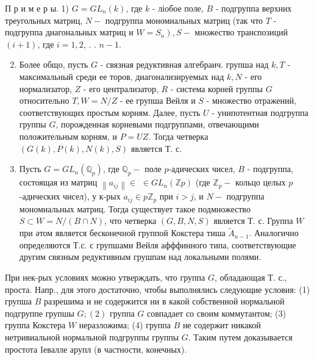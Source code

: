 \documentclass[10pt]{article}
\begin{document}
П р и м е р ы. 1) $G=G L_{n}(k)$, где $k$ - ліобое поле, $B$ - подгруппа верхних треугольных матриц, $N-$ подгруппа мономиальных матриц (так что $T$ - подгруппа диагональных матриц и $\left.W=S_{n}\right), S-$ множество транспозиций $(i+1)$, где $i=1,2$, . . $n-1$.



\begin{enumerate}

  \setcounter{enumi}{1}

  \item Более общо, пусть $G$ - связная редуктивная алгебраич. групша над $k, T$ - максимальный среди ее торов, диагонализируемых над $k, N$ - его нормализатор, $Z$ - его централизатор, $R$ - система корней группы $G$ относительно $T, W=N / Z$ - ее групша Вейля и $S$ - множество отражений, соответствующих простым корням. Далее, пусть $U$ - унипотентная подгруппа группы $G$, порожденная корневыми подгруппами, отвечающими положительным корням, и $P=U Z$. Тогда четверка $(G(k), P(k), N(k), S)$ является Т. с.



  \item Пусть $G=G L_{n}\left(\mathbb{Q}_{p}\right)$, где $\mathbb{Q}_{p}-$ поле $p$-адических чисел, $B$ - подгруппа, состоящая из матриц $\left\|a_{i j}\right\| \in$ $\in G L_{n}(\mathbb{Z} p)$ (где $\mathbb{Z}_{p}-$ кольцо целых $p$-адических чисел), у к-рых $a_{i j} \in p \mathbb{Z}_{p}$ при $i>j$, и $N-$ подгруппа мономиальных матриц. Тогда существует такое подмножество $S \subset W=N /(B \cap N)$, что четверка $(G, B, N, S)$ является Т. с. Группа $W$ при әтом является бесконечной группой Кокстера тиша $\tilde{A}_{n-1}$. Аналогично определяются Т.с. с групшами Вейля афффинного типа, соответствующие другим связным редуктивным грушпам над локальными полями.



\end{enumerate}



При нек-рых условиях можно утверждать, что группа $G$, обладающая Т. с., проста. Напр., для этого достаточно, чтобы выполнялись следующие условия: (1) групша $B$ разрешима и не содержится ни в какой собственной нормальной подгруппе групшы $G ;(2)$ группа $G$ совпадает со своим коммутантом; (3) группа Кокстера $W$ неразложима; (4) группа $B$ не содержит никакой нетривиальной нормальной подгруппы группы $G$. Таким путем доказывается простота Iевалле арупл (в частности, конечных).
\end{document}

